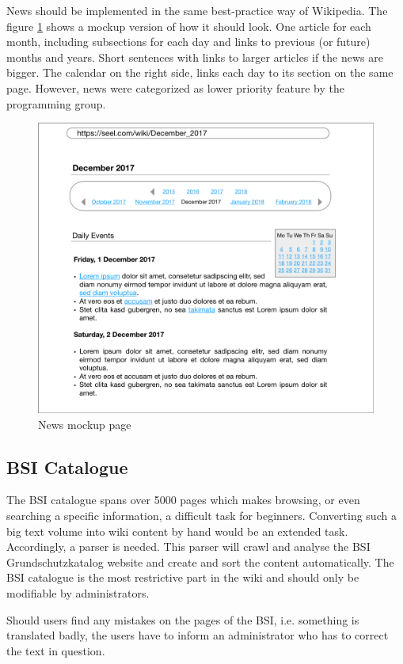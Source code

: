 \begin{tcolorbox}[breakable,colback=red!14,colframe=red!40!black,title=UPDATE 10/12/2017]
News should be implemented in the same best-practice way of Wikipedia. The figure \ref{fig:NewsMockUpPage} shows a mockup version of how it should look.
One article for each month, including subsections for each day and links to previous (or future) months and years. 
Short sentences with links to larger articles if the news are bigger.  
The calendar on the right side, links each day to its section on the same page.
However, news were categorized as lower priority feature by the programming group. 
\end{tcolorbox}

\begin{figure}[h] 
    \centering
    		\includegraphics[scale=0.5]{Pictures/NewsMockUp}
    \caption{News mockup page}
    	\label{fig:NewsMockUpPage}
\end{figure} 



\subsection{BSI Catalogue}
\label{BSIc}
The BSI catalogue spans over 5000 pages which makes browsing, or even searching a specific information, a difficult task for beginners. 
Converting such a big text volume into wiki content by hand would be an extended task. 
Accordingly, a parser is needed. 
This parser will crawl and analyse the BSI Grundschutzkatalog website and create and sort the content automatically. 
The BSI catalogue is the most restrictive part in the wiki and should only be modifiable by administrators.
\begin{tcolorbox}[breakable,colback=red!12,colframe=red!40!black,title=UPDATE 15/11/2017]
    Should users find any mistakes on the pages of the BSI, i.e. something is translated badly, the users have to inform an administrator who has to correct the text in question.
\end{tcolorbox}
\bigskip

